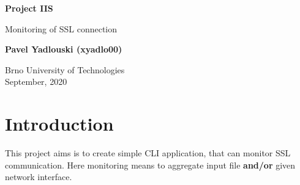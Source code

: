 \documentclass[12pt,a4paper]{article}
\begin{document}
    \begin{titlepage}
        \begin{center}
            \vspace*{1cm}
    
            \Large{\textbf{Project IIS}}
    
            \vspace{0.5cm}
            Monitoring of SSL connection
                
            \vspace{1.5cm}
            
            \textbf{Pavel Yadlouski (xyadlo00)}
    
            \vfill
                
            \vspace{0.8cm}
        
            Brno University of Technologies\\
            September, 2020
                
        \end{center}
    \end{titlepage}
    
    \tableofcontents
    \newpage

    \section{Introduction}
    This project aims is to create simple CLI application, that can monitor SSL communication.
    Here monitoring means to aggregate input file \textbf{and/or} given network interface.  
        
\end{document}
